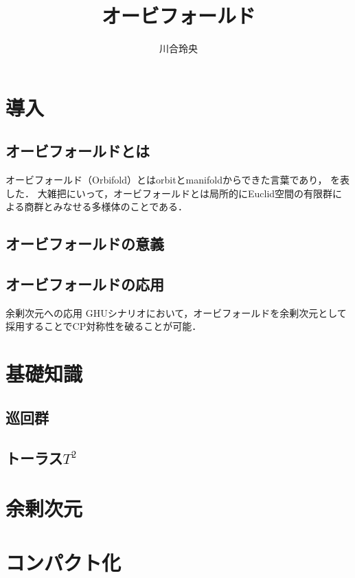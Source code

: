 \documentclass[uplatex]{jsarticle}
\numberwithin{theorem}{section}
\begin{document}
\title{オービフォールド}
\author{川合玲央}

\maketitle

\tableofcontents

\section{導入}

\subsection{オービフォールドとは}
オービフォールド（Orbifold）とはorbitとmanifoldからできた言葉であり，
を表した．
大雑把にいって，オービフォールドとは局所的にEuclid空間の有限群による商群とみなせる多様体のことである．

\subsection{オービフォールドの意義}

\subsection{オービフォールドの応用}
余剰次元への応用
GHUシナリオにおいて，オービフォールドを余剰次元として採用することでCP対称性を破ることが可能．

\section{基礎知識}

\subsection{巡回群}

\subsection{トーラス$T^2$}


\section{余剰次元}


\section{コンパクト化}
\end{document}
